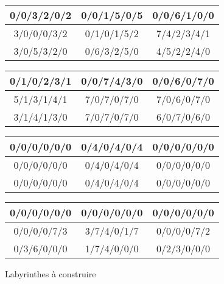 \documentclass[a4paper]{article}
\begin{document}
\begin{figure}[htbp]
  \centering
\begin{tabular}{|c|c|c|}
  \hline
  0/0/3/2/0/2 & 0/0/1/5/0/5 & 0/0/6/1/0/0 \\
  \hline
  3/0/0/0/3/2 & 0/1/0/1/5/2 & 7/4/2/3/4/1 \\
  \hline
  3/0/5/3/2/0 & 0/6/3/2/5/0 & 4/5/2/2/4/0 \\
  \hline
\end{tabular}
\hspace{0.5cm}
\begin{tabular}{|c|c|c|}
  \hline
  0/1/0/2/3/1 & 0/0/7/4/3/0 & 0/0/6/0/7/0 \\
  \hline
  5/1/3/1/4/1 & 7/0/7/0/7/0 & 7/0/6/0/7/0 \\
  \hline
  3/1/4/1/3/0 & 7/0/7/0/7/0 & 6/0/7/0/6/0 \\
  \hline
\end{tabular}

\vspace{0.5cm}

\begin{tabular}{|c|c|c|}
  \hline
  0/0/0/0/0/0 & 0/4/0/4/0/4 & 0/0/0/0/0/0 \\
  \hline
  0/0/0/0/0/0 & 0/4/0/4/0/4 & 0/0/0/0/0/0 \\
  \hline
  0/0/0/0/0/0 & 0/4/0/4/0/4 & 0/0/0/0/0/0 \\
  \hline
\end{tabular}
\hspace{0.5cm}
\begin{tabular}{|c|c|c|}
  \hline
  0/0/0/0/0/0 & 0/0/0/0/0/0 & 0/0/0/0/0/0 \\
  \hline
  0/0/0/0/7/3 & 3/7/4/0/1/7 & 0/0/0/0/7/2 \\
  \hline
  0/3/6/0/0/0 & 1/7/4/0/0/0 & 0/2/3/0/0/0 \\
  \hline
\end{tabular}
\caption{Labyrinthes à construire}\label{table:groslabs}
\end{figure}



\end{document}
